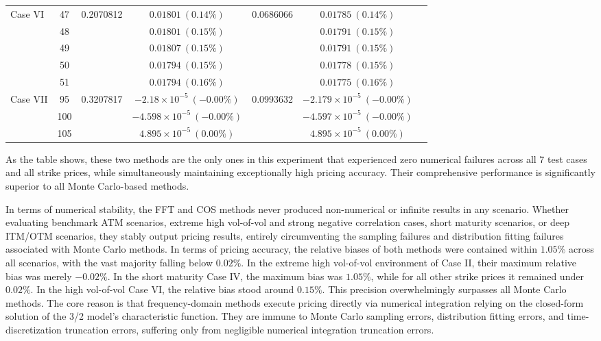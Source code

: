 \begin{table}[htbp]
{\begin{tabular}{lclcccc}
    \multirow{5}{*}{Case VI}
    & 47 & \multirow{5}{*}{0.2070812} & $0.01801\ (0.14\%)$ & \multirow{5}{*}{0.0686066} & $0.01785\ (0.14\%)$ \\
    & 48 & & $0.01801\ (0.15\%)$ & & $0.01791\ (0.15\%)$ \\
    & 49 & & $0.01807\ (0.15\%)$ & & $0.01791\ (0.15\%)$ \\
    & 50 & & $0.01794\ (0.15\%)$ & & $0.01778\ (0.15\%)$ \\
    & 51 & & $0.01794\ (0.16\%)$ & & $0.01775\ (0.16\%)$ \\
    \midrule
    \multirow{3}{*}{Case VII}
    & 95 & \multirow{3}{*}{0.3207817} & $-2.18\times10^{-5}\ (-0.00\%)$ & \multirow{3}{*}{0.0993632} & $-2.179\times10^{-5}\ (-0.00\%)$ \\
    & 100 & & $-4.598\times10^{-5}\ (-0.00\%)$ & & $-4.597\times10^{-5}\ (-0.00\%)$ \\
    & 105 & & $4.895\times10^{-5}\ (0.00\%)$ & & $4.895\times10^{-5}\ (0.00\%)$ \\
    \bottomrule
  \end{tabular}%
  }
\end{table}

As the table shows, these two methods are the only ones in this experiment that experienced zero numerical failures across all 7 test cases and all strike prices, while simultaneously maintaining exceptionally high pricing accuracy. Their comprehensive performance is significantly superior to all Monte Carlo-based methods.

In terms of numerical stability, the FFT and COS methods never produced non-numerical or infinite results in any scenario. Whether evaluating benchmark ATM scenarios, extreme high vol-of-vol and strong negative correlation cases, short maturity scenarios, or deep ITM/OTM scenarios, they stably output pricing results, entirely circumventing the sampling failures and distribution fitting failures associated with Monte Carlo methods. In terms of pricing accuracy, the relative biases of both methods were contained within $1.05\%$ across all scenarios, with the vast majority falling below $0.02\%$. In the extreme high vol-of-vol environment of Case II, their maximum relative bias was merely $-0.02\%$. In the short maturity Case IV, the maximum bias was $1.05\%$, while for all other strike prices it remained under $0.02\%$. In the high vol-of-vol Case VI, the relative bias stood around $0.15\%$. This precision overwhelmingly surpasses all Monte Carlo methods. The core reason is that frequency-domain methods execute pricing directly via numerical integration relying on the closed-form solution of the 3/2 model's characteristic function. They are immune to Monte Carlo sampling errors, distribution fitting errors, and time-discretization truncation errors, suffering only from negligible numerical integration truncation errors.

